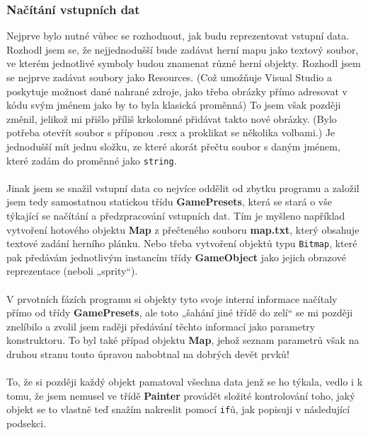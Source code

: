 \documentclass[a4]{article}
\begin{document}
\subsubsection{Načítání vstupních dat}
Nejprve bylo nutné vůbec se rozhodnout, jak budu reprezentovat vstupní data. Rozhodl jsem se, že nejjednodušší bude zadávat herní mapu jako textový soubor, ve kterém jednotlivé symboly budou znamenat různé herní objekty. Rozhodl jsem se nejprve zadávat soubory jako Resources. (Což umožňuje Visual Studio a poskytuje možnost dané nahrané zdroje, jako třeba obrázky přímo adresovat v kódu svým jménem jako by to byla klasická proměnná) To jsem však později změnil, jelikož mi přišlo příliš krkolomné přidávat takto nové obrázky. (Bylo potřeba otevřít soubor s příponou .resx a proklikat se několika volbami.) Je jednodušší mít jednu složku, ze které akorát přečtu soubor s daným jménem, které zadám do proměnné jako \verb|string|.
\\\\
Jinak jsem se snažil vstupní data co nejvíce oddělit od zbytku programu a založil jsem tedy samostatnou statickou třídu \textbf{GamePresets}, která se stará o vše týkající se načítání a předzpracování vstupních dat. Tím je myšleno například vytvoření hotového objektu \textbf{Map} z přečteného souboru \textbf{map.txt}, který obsahuje textové zadání herního plánku. Nebo třeba vytvoření objektů typu \verb|Bitmap|, které pak předávám jednotlivým instancím třídy \textbf{GameObject} jako jejich obrazové reprezentace (neboli „sprity“).
\\\\
V prvotních fázích programu si objekty tyto svoje interní informace načítaly přímo od třídy \textbf{GamePresets}, ale toto „šahání jiné třídě do zelí“ se mi později znelíbilo a zvolil jsem raději předávání těchto informací jako parametry konstruktoru. To byl také případ objektu \textbf{Map}, jehož seznam parametrů však na druhou stranu touto úpravou nabobtnal na dobrých devět prvků!
\\\\
To, že si později každý objekt pamatoval všechna data jenž se ho týkala, vedlo i k tomu, že jsem nemusel ve třídě \textbf{Painter} provádět složité kontrolování toho, jaký objekt se to vlastně teď snažím nakreslit pomocí \verb|if|ů, jak popisuji v následující podsekci.
\end{document}
